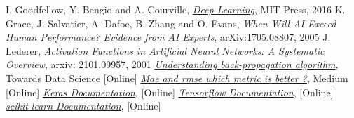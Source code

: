 \begin{thebibliography}{9}
 I. Goodfellow, Y. Bengio and A. Courville, \href{http://www.deeplearningbook.org}{\emph{Deep Learning}}, MIT Press, 2016
K. Grace, J. Salvatier, A. Dafoe, B. Zhang and O. Evans, \emph{When Will AI Exceed Human Performance? Evidence from AI Experts}, arXiv:1705.08807, 2005
 J. Lederer, \emph{Activation Functions in Artificial Neural Networks: A Systematic Overview}, arxiv: 2101.09957, 2001
\href{https://towardsdatascience.com/understanding-backpropagation-algorithm-7bb3aa2f95fd}{\emph{Understanding back-propagation algorithm}}, Towards Data Science [Online]
\href{https://medium.com/human-in-a-machine-world/mae-and-rmse-which-metric-is-better-e60ac3bde13d}{\emph{Mae and rmse which metric is better ?}}, Medium [Online]
\href{https://keras.io/}{\emph{Keras Documentation}}, [Online]  
\href{https://www.tensorflow.org/}{\emph{Tensorflow Documentation}}, [Online] 
\href{https://scikit-learn.org/stable/}{\emph{scikit-learn Documentation}}, [Online]
\end{thebibliography}